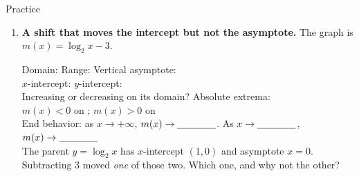 \documentclass[10pt]{article}
\newcommand{\lgrid}[4]{%
  \draw[step=1, linegray!40, very thin] (#1,#3) grid (#2,#4);
  \draw[->, semithick, charcoal] (#1,0)--(#2,0) node[below right, font=\scriptsize]{$x$};
  \draw[->, semithick, charcoal] (0,#3)--(0,#4) node[left, font=\scriptsize]{$y$};}
\newcommand{\logcurve}[5]{\draw[very thick, forest, domain=#4:#5, samples=120, smooth]
  plot ({pow(#1,\x-(#3))+(#2)},{\x});}
\begin{document}
\begin{notesbox}{Practice}
\begin{enumerate}[leftmargin=1.9em, itemsep=12pt]
  \item \textbf{A shift that moves the intercept but not the asymptote.} The graph is
        $m(x) = \log_2 x - 3$.
    \begin{center}
    \end{center}
    Domain: \blank{3.0cm} \quad Range: \blank{3.0cm} \quad Vertical asymptote: \blank{2.0cm} \\[3pt]
    $x$-intercept: \blank{1.8cm} \quad $y$-intercept: \blank{1.8cm} \\[3pt]
    Increasing or decreasing on its domain? \blank{2.4cm} \quad Absolute extrema: \blank{2.0cm} \\[3pt]
    $m(x)<0$ on \blank{2.6cm}; \quad $m(x)>0$ on \blank{2.6cm} \\[3pt]
    End behavior: as $x\to+\infty$, $m(x)\to\blank{1.4cm}$. \; As $x\to\blank{1.4cm}$,
    $m(x)\to\blank{1.4cm}$ \\[3pt]
    The parent $y=\log_2 x$ has $x$-intercept $(1,0)$ and asymptote $x=0$. Subtracting $3$ moved
    \emph{one} of those two. Which one, and why not the other? \blank{5.0cm}


\end{enumerate}
\end{notesbox}
\end{document}
